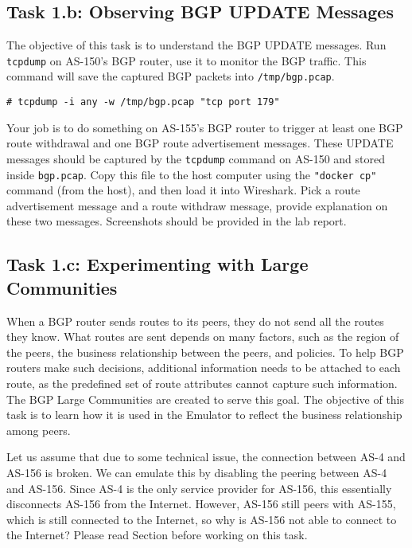 \subsection{Task 1.b: Observing BGP UPDATE Messages} 

The objective of this task is to understand the BGP UPDATE messages. 
Run \texttt{tcpdump} on AS-150's BGP router,
use it to monitor the BGP traffic. This command will save the 
captured BGP packets into \texttt{/tmp/bgp.pcap}.  

\begin{lstlisting}
# tcpdump -i any -w /tmp/bgp.pcap "tcp port 179"
\end{lstlisting}

Your job is to do something on AS-155's BGP router to trigger
at least one BGP route withdrawal and one BGP route advertisement
messages. These UPDATE messages should be captured by
the \texttt{tcpdump} command on AS-150 and stored inside \texttt{bgp.pcap}.
Copy this file to the host computer using the \texttt{"docker cp"} command (from the host),
and then load it into Wireshark. 
Pick a route advertisement message and a route withdraw message, provide
explanation on these two messages. Screenshots should be provided in the 
lab report.



\subsection{Task 1.c: Experimenting with Large Communities} 

When a BGP router sends routes to its peers, they do not send all the routes they
know. What routes are sent depends on many factors, such as the
region of the peers, the business relationship between the peers,
and policies. To help BGP routers make such decisions, additional
information needs to be attached to each route, as the predefined
set of route attributes cannot capture such information.
The BGP Large Communities are created to serve this goal.
The objective of this task is to learn how it is used 
in the Emulator to reflect the business relationship
among peers. 

Let us assume that due to some technical issue, 
the connection between AS-4 and AS-156 is broken.  We can
emulate this by disabling the peering between AS-4 and AS-156.
Since AS-4 is the only service provider for AS-156, this essentially
disconnects AS-156 from the Internet. However, AS-156 still peers with AS-155, 
which is still connected to the Internet, so why is AS-156 not able to 
connect to the Internet?  
Please read Section \bigcommunity before working on this task. 

